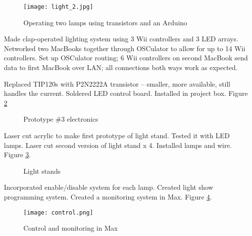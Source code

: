 \begin{figure}[t]
	\centering

	\texttt{[image: light\_2.jpg]}
	\caption{Operating two lamps using transistors and an Arduino}

	\label{prototyping3.3}
\end{figure}

Made clap-operated lighting system using 3 Wii controllers and 3 LED arrays. Networked two MacBooks together through OSCulator to allow for up to 14 Wii controllers. Set up OSCulator routing; 6 Wii controllers on second MacBook send data to first MacBook over LAN; all connections both ways work as expected.

Replaced TIP120s with P2N2222A transistor -- smaller, more available, still handles the current. Soldered LED control board. Installed in project box. Figure \ref{prototyping3.4}

\begin{figure}[t]
	\centering

	\hspace{0.1cm}

	\caption{Prototype \#3 electronics}

	\label{prototyping3.4}
\end{figure}

Laser cut acrylic to make first prototype of light stand. Tested it with LED lamps. Laser cut second version of light stand x 4. Installed lamps and wire. Figure \ref{prototyping3.5}.

\begin{figure}[t]
	\centering

	\hspace{0.1cm}

	\caption{Light stands}

	\label{prototyping3.5}
\end{figure}

Incorporated enable/disable system for each lamp. Created light show programming system. Created a monitoring system in Max. Figure \ref{prototyping3.6}.

\begin{figure}[t]
	\centering

	\texttt{[image: control.png]}
	\caption{Control and monitoring in Max}

	\label{prototyping3.6}
\end{figure}

